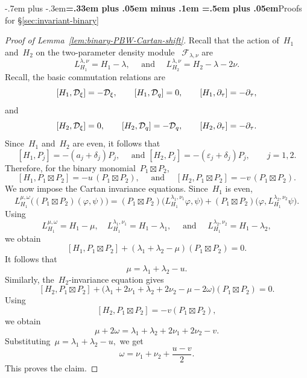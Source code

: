 \documentclass[12pt,a4paper]{amsart}
\makeatletter
\providecommand{\headspaces}{\spaceskip=.33em plus .05em minus .1em \xspaceskip=.5em plus .05em}
\def\subsection{\@startsection{subsection}{2}{0pt}{-1ex \@plus -.4ex \@minus -.2ex}%
  {-.7em plus -.3em}{\normalfont\normalsize\bfseries\boldmath\headspaces}}
\theoremstyle{thm}
\theoremstyle{definition}
\let\ssec\subsection
\newcommand {\Dq}{\cD_q}
\newcommand {\Dxi}{\cD_\xi}
\makeatother
\begin{document}
\ssec{Proofs for \S\ref{sec:invariant-binary}}

\begin{proof}[Proof of Lemma~\textup{\ref{lem:binary-PBW-Cartan-shift}}]
Recall that the action of~$H_1$ and~$H_2$ on the two-parameter density module~%
\(\mathcal F_{\lambda,\nu}\) are
\[
L_{H_1}^{\lambda,\nu}
=
H_1-\lambda,
\quad \text{ and } \quad
L_{H_2}^{\lambda,\nu}
=
H_2-\lambda-2\nu.
\]
Recall, the basic commutation relations are
\[
[H_1,\Dxi]=-\Dxi,
\qquad
[H_1,\Dq]=0,
\qquad
[H_1,\partial_\tau]=-\partial_\tau,
\]
and
\[
[H_2,\Dxi]=0,
\qquad
[H_2,\Dq]=-\Dq,
\qquad
[H_2,\partial_\tau]=-\partial_\tau.
\]
Since~\(H_1\) and~\(H_2\) are even, it follows that
\[
[H_1,P_j]
=
-(a_j+\delta_j)P_j,
\quad
\text{ and }
[H_2,P_j]
=
-(\varepsilon_j+\delta_j)P_j,
\qquad
j=1,2.
\]
Therefore, for the binary monomial~\(P_1\boxtimes P_2\),
\[
[H_1,P_1\boxtimes P_2]
=
-u\,(P_1\boxtimes P_2),
\quad \text{ and } \quad
[H_2,P_1\boxtimes P_2]
=
-v\,(P_1\boxtimes P_2).
\]
We now impose the Cartan invariance equations. Since~\(H_1\) is even,
\[
L_{H_1}^{\mu,\omega}
\bigl(
(P_1\boxtimes P_2)(\varphi,\psi)
\bigr)
=
(P_1\boxtimes P_2)
\bigl(
L_{H_1}^{\lambda_1,\nu_1}\varphi,\psi
\bigr)
+
(P_1\boxtimes P_2)
\bigl(
\varphi,
L_{H_1}^{\lambda_2,\nu_2}\psi
\bigr).
\]
Using
\[
L_{H_1}^{\mu,\omega}=H_1-\mu,
\quad
L_{H_1}^{\lambda_1,\nu_1}=H_1-\lambda_1,
\quad \text{ and } \quad
L_{H_1}^{\lambda_2,\nu_2}=H_1-\lambda_2,
\]
we obtain
\[
[H_1,P_1\boxtimes P_2]
+
(\lambda_1+\lambda_2-\mu)
(P_1\boxtimes P_2)
=
0.
\]
It follows that
\[
\mu=\lambda_1+\lambda_2-u.
\]
Similarly, the~\(H_2\)-invariance equation gives
\[
[H_2,P_1\boxtimes P_2]
+
\bigl(
\lambda_1+2\nu_1
+
\lambda_2+2\nu_2
-
\mu-2\omega
\bigr)
(P_1\boxtimes P_2)
=
0.
\]
Using
\[
[H_2,P_1\boxtimes P_2]
=
-v(P_1\boxtimes P_2),
\]
we obtain
\[
\mu+2\omega
=
\lambda_1+\lambda_2
+
2\nu_1+2\nu_2
-v.
\]
Substituting~$
\mu=\lambda_1+\lambda_2-u,$
we get
\[
\omega
=
\nu_1+\nu_2+\frac{u-v}{2}.
\]
This proves the claim.
\end{proof}
\end{document}
